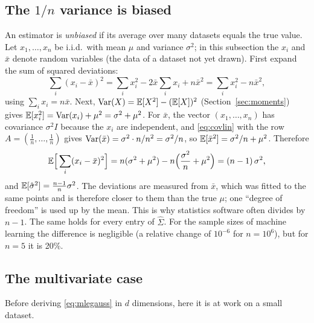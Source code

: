 \documentclass[11pt]{article}
\begin{document}
\subsection{The \texorpdfstring{$1/n$}{1/n} variance is biased}\label{sec:bias}

An estimator is \emph{unbiased} if its average over many datasets equals the true value. Let $x_1, \dots, x_n$ be
i.i.d.\ with mean $\mu$ and variance $\sigma^2$; in this subsection the $x_i$ and $\bar x$ denote random variables
(the data of a dataset not yet drawn). First expand the sum of squared deviations:
\[
  \sum_i (x_i - \bar x)^2 = \sum_i x_i^2 - 2\bar x\sum_i x_i + n\bar x^2 = \sum_i x_i^2 - n\bar x^2 ,
\]
using $\sum_i x_i = n\bar x$. Next, $\operatorname{Var}(X) = \mathbb{E}[X^2] - (\mathbb{E}[X])^2$ (Section~\ref{sec:moments}) gives
$\mathbb{E}[x_i^2] = \operatorname{Var}(x_i) + \mu^2 = \sigma^2 + \mu^2$. For $\bar x$, the vector $(x_1, \dots, x_n)$ has covariance
$\sigma^2 I$ because the $x_i$ are independent, and \eqref{eq:covlin} with the row $A = (\frac1n, \dots, \frac1n)$
gives $\operatorname{Var}(\bar x) = \sigma^2 \cdot n/n^2 = \sigma^2/n$, so $\mathbb{E}[\bar x^2] = \sigma^2/n + \mu^2$. Therefore
\[
  \mathbb{E}\Big[\sum_i (x_i - \bar x)^2\Big] = n(\sigma^2 + \mu^2) - n\Big(\frac{\sigma^2}{n} + \mu^2\Big) = (n - 1)\,\sigma^2 ,
\]
and $\mathbb{E}[\hat\sigma^2] = \frac{n-1}{n}\sigma^2$. The deviations are measured from $\bar x$, which was fitted to the same
points and is therefore closer to them than the true $\mu$; one ``degree of freedom'' is used up by the mean. This
is why statistics software often divides by $n - 1$. The same holds for every entry of $\hat\Sigma$. For the sample
sizes of machine learning the difference is negligible (a relative change of $10^{-6}$ for $n = 10^6$), but for
$n = 5$ it is 20\%.

\subsection{The multivariate case}\label{sec:mlend}

Before deriving \eqref{eq:mlegauss} in $d$ dimensions, here it is at work on a small dataset.
\end{document}

